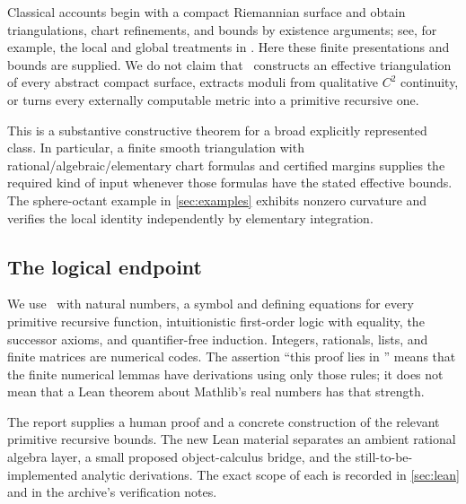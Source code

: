 Classical accounts begin with a compact Riemannian surface and obtain triangulations, chart refinements, and bounds by existence arguments; see, for example, the local and global treatments in \cite{new,shifrin}. Here these finite presentations and bounds are supplied. We do not claim that \ipra\ constructs an effective triangulation of every abstract compact surface, extracts moduli from qualitative $C^2$ continuity, or turns every externally computable metric into a primitive recursive one.

This is a substantive constructive theorem for a broad explicitly represented class. In particular, a finite smooth triangulation with rational/algebraic/elementary chart formulas and certified margins supplies the required kind of input whenever those formulas have the stated effective bounds. The sphere-octant example in \cref{sec:examples} exhibits nonzero curvature and verifies the local identity independently by elementary integration.

\subsection{The logical endpoint}

We use \ipra\ with natural numbers, a symbol and defining equations for every primitive recursive function, intuitionistic first-order logic with equality, the successor axioms, and quantifier-free induction. Integers, rationals, lists, and finite matrices are numerical codes. The assertion ``this proof lies in \ipra'' means that the finite numerical lemmas have derivations using only those rules; it does not mean that a Lean theorem about Mathlib's real numbers has that strength.

The report supplies a human proof and a concrete construction of the relevant primitive recursive bounds. The new Lean material separates an ambient rational algebra layer, a small proposed object-calculus bridge, and the still-to-be-implemented analytic derivations. The exact scope of each is recorded in \cref{sec:lean} and in the archive's verification notes.
